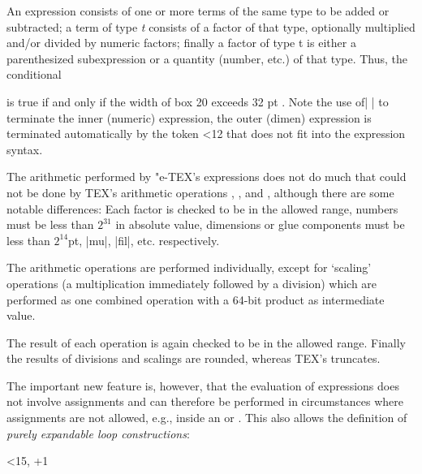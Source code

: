 An expression consists of one or more terms of
the same type to be added or subtracted; a term of type \textit{t} consists of a factor
of that type, optionally multiplied and/or divided by numeric factors; finally a
factor of type t is either a parenthesized subexpression or a quantity (number,
etc.) of that type. Thus, the conditional


is true if and only if the width of box 20 exceeds 32 pt . Note the use of| \relax|
to terminate the inner (numeric) expression, the outer (dimen) expression is
terminated automatically by the token <12 that does not fit into the expression
syntax.

The arithmetic performed by "e-TEX's expressions does not do much that
could not be done by TEX's arithmetic operations , , and
, although there are some notable differences: Each factor is checked to
be in the allowed range, numbers must be less than $2^{31}$ in absolute value, dimensions or glue components must be less than $2^{14}$pt, |mu|, |fil|, etc. respectively.


The arithmetic operations are performed individually, except for `scaling' operations
(a multiplication immediately followed by a division) which are performed
as one combined operation with a 64-bit product as intermediate value. 

The
result of each operation is again checked to be in the allowed range. Finally the
results of divisions and scalings are rounded, whereas TEX's  truncates.

The important new feature is, however, that the evaluation of expressions
does not involve assignments and can therefore be performed in circumstances
where assignments are not allowed, e.g., inside an  or . This also
allows the definition of \textit{purely expandable loop constructions}:



\begin{teX}
\def\foo#1#2{\number#1
\ifnum#1<#2,
  \expandafter\foo
  \expandafter{\number\numexpr#1+1\expandafter}%
  \expandafter{\number#2\expandafter}%
\fi}


\foo{9}{15}
\end{teX}


\def\foo#1#2{\number#1
\ifnum#1<#2,
  \expandafter\foo
  \expandafter{\number\numexpr#1+1\expandafter}%
  \expandafter{\number#2\expandafter}%
\fi}


